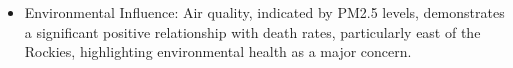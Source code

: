 \documentclass[
]{article}
\providecommand{\tightlist}{%
  \setlength{\itemsep}{0pt}\setlength{\parskip}{0pt}}\usepackage{longtable,booktabs,array}
\begin{document}
\begin{figure}


\caption{\label{fig-7}}

\end{figure}%

\begin{itemize}
\tightlist
\item
  Environmental Influence: Air quality, indicated by PM2.5 levels,
  demonstrates a significant positive relationship with death rates,
  particularly east of the Rockies, highlighting environmental health as
  a major concern.
\end{itemize}

\begin{figure}

\begin{minipage}{0.50\linewidth}



\end{minipage}%
%
\begin{minipage}{0.50\linewidth}



\end{minipage}%

\end{figure}%
\end{document}
